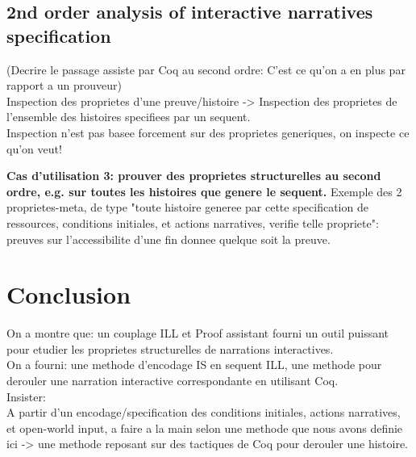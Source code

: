 \documentclass[runningheads,a4paper]{llncs}
\begin{document}
\subsection{2nd order analysis of interactive narratives specification}
(Decrire le passage assiste par Coq au second ordre: C'est ce qu'on a en plus par rapport a un prouveur)
\\
Inspection des proprietes d'une preuve/histoire -> Inspection des proprietes de l'ensemble des histoires specifiees par un sequent.\\
Inspection n'est pas basee forcement sur des proprietes generiques, on inspecte ce qu'on veut!

\textbf{Cas d'utilisation 3: prouver des proprietes structurelles au second ordre, e.g. sur toutes les histoires que genere le sequent.}
Exemple des 2 proprietes-meta, de type "toute histoire generee par cette specification de ressources, conditions initiales, et actions narratives, verifie telle propriete":\\ preuves sur l'accessibilite d'une fin donnee quelque soit la preuve.
\section{Conclusion}
On a montre que: un couplage ILL et Proof assistant fourni un outil puissant pour etudier les proprietes structurelles de narrations interactives.\\
On a fourni: une methode d'encodage IS en sequent ILL, une methode pour derouler une narration interactive correspondante en utilisant Coq.\\
Insister:\\
A partir d'un encodage/specification des conditions initiales, actions narratives, et open-world input, a faire a la main selon une methode que nous avons definie ici -> une methode reposant sur des tactiques de Coq pour derouler une histoire.

%


\end{document}

